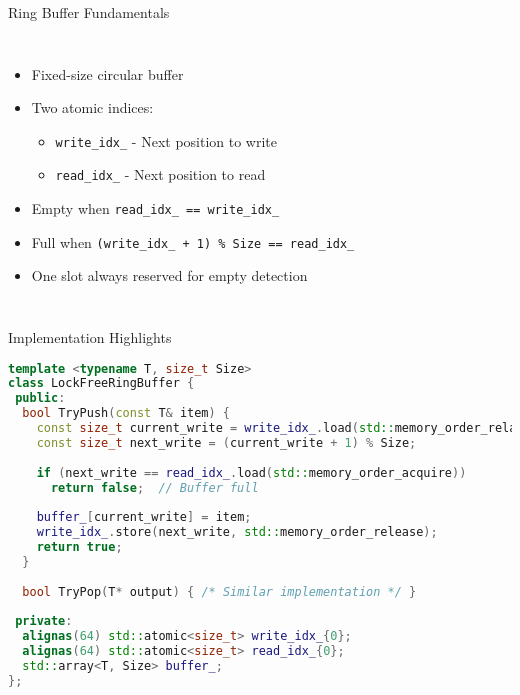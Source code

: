 \documentclass{beamer}
\begin{document}
\begin{frame}{Ring Buffer Fundamentals}
\begin{columns}
    \begin{itemize}
        \item Fixed-size circular buffer
        \item Two atomic indices:
        \begin{itemize}
            \item \texttt{write\_idx\_} - Next position to write
            \item \texttt{read\_idx\_} - Next position to read
        \end{itemize}
        \item Empty when \texttt{read\_idx\_ == write\_idx\_}
        \item Full when \texttt{(write\_idx\_ + 1) \% Size == read\_idx\_}
        \item One slot always reserved for empty detection
    \end{itemize}

\end{columns}
\end{frame}

\begin{frame}[fragile]{Implementation Highlights}
\begin{lstlisting}[language=C++]
template <typename T, size_t Size>
class LockFreeRingBuffer {
 public:
  bool TryPush(const T& item) {
    const size_t current_write = write_idx_.load(std::memory_order_relaxed);
    const size_t next_write = (current_write + 1) % Size;
    
    if (next_write == read_idx_.load(std::memory_order_acquire))
      return false;  // Buffer full
    
    buffer_[current_write] = item;
    write_idx_.store(next_write, std::memory_order_release);
    return true;
  }
  
  bool TryPop(T* output) { /* Similar implementation */ }
  
 private:
  alignas(64) std::atomic<size_t> write_idx_{0};
  alignas(64) std::atomic<size_t> read_idx_{0};
  std::array<T, Size> buffer_;
};
\end{lstlisting}
\end{frame}
\end{document}
